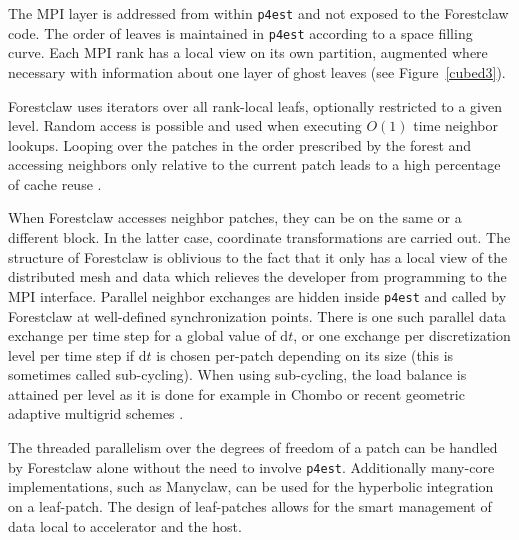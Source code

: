 \documentclass{IOS-Book-Article}     %
\newcommand{\comment}[1]{\textcolor{green}{[DAC: #1]}\xspace}
\newcommand{\dt}{\mathrm{d}t}
\newcommand{\forestclaw}{Forestclaw\xspace}
\newcommand{\pforest}{\texttt{p4est}\xspace}
\newcommand{\manyclaw}{Manyclaw\xspace}
\begin{document}
The MPI layer is addressed from within \pforest and not exposed to the
\forestclaw code.  The order of leaves is maintained in \pforest according to a
space filling curve.  Each MPI rank has a local view on its own partition,
augmented where necessary with information about one layer of ghost leaves
(see Figure~\ref{cubed3}).

\forestclaw uses iterators over all rank-local leafs, optionally restricted to
a given level.  Random access is possible and used when executing $O(1)$ time
neighbor lookups.  Looping over the patches in the order prescribed by the
forest
and
accessing neighbors only relative to the current patch leads to a high
percentage of cache reuse
\cite{BursteddeBurtscherGhattasEtAl09}.

When \forestclaw accesses neighbor patches, they can be on the same or a
different block.  In the latter case, coordinate transformations are carried
out.  The structure of \forestclaw is oblivious to the fact that it only has a
local view of the distributed mesh and data which relieves the developer from
programming to the MPI interface.  Parallel neighbor exchanges are hidden
inside \pforest and called by \forestclaw at well-defined synchronization
points.  There is one such parallel data exchange per time step for a global
value of $\dt$, or one exchange per discretization level per time step if $\dt$
is chosen per-patch depending on its size (this is sometimes called
sub-cycling).  When using sub-cycling, the load balance is attained per level as
it is done for example in Chombo \cite{ColellaGravesKeenEtAl07}
or recent geometric adaptive multigrid schemes
\cite{SundarBirosBursteddeEtAl12}.

The threaded parallelism over the degrees of freedom of a patch can be handled
by \forestclaw alone without the need to involve \pforest.  Additionally many-core implementations, such as \manyclaw \cite{manyclaw}, can be used for the hyperbolic integration on a leaf-patch.  The design of leaf-patches allows for the smart management of data local to accelerator and the host.



\end{document}
